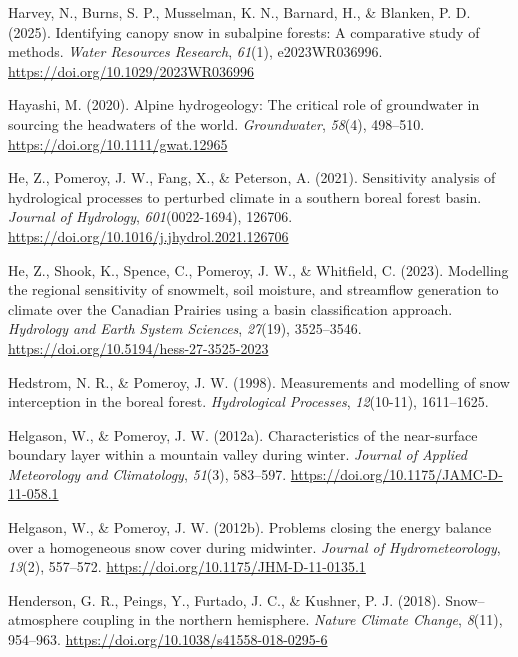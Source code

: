 \documentclass[
  letterpaper,
]{tex/uofsthesis-cs}
\newlength{\cslhangindent}
\newenvironment{CSLReferences}[2] %
 {\begin{list}{}{%
  \setlength{\itemindent}{0pt}
  \setlength{\leftmargin}{0pt}
  \setlength{\parsep}{0pt}
  \ifodd #1
   \setlength{\leftmargin}{\cslhangindent}
   \setlength{\itemindent}{-1\cslhangindent}
  \fi
  \setlength{\itemsep}{#2\baselineskip}}}
 {\end{list}}
\begin{document}
\begin{CSLReferences}{1}{0}
Harvey, N., Burns, S. P., Musselman, K. N., Barnard, H., \& Blanken, P.
D. (2025). Identifying canopy snow in subalpine forests: A comparative
study of methods. \emph{Water Resources Research}, \emph{61}(1),
e2023WR036996. \url{https://doi.org/10.1029/2023WR036996}

Hayashi, M. (2020). Alpine hydrogeology: {The} critical role of
groundwater in sourcing the headwaters of the world. \emph{Groundwater},
\emph{58}(4), 498--510. \url{https://doi.org/10.1111/gwat.12965}

He, Z., Pomeroy, J. W., Fang, X., \& Peterson, A. (2021). Sensitivity
analysis of hydrological processes to perturbed climate in a southern
boreal forest basin. \emph{Journal of Hydrology}, \emph{601}(0022-1694),
126706. \url{https://doi.org/10.1016/j.jhydrol.2021.126706}

He, Z., Shook, K., Spence, C., Pomeroy, J. W., \& Whitfield, C. (2023).
Modelling the regional sensitivity of snowmelt, soil moisture, and
streamflow generation to climate over the {Canadian Prairies} using a
basin classification approach. \emph{Hydrology and Earth System
Sciences}, \emph{27}(19), 3525--3546.
\url{https://doi.org/10.5194/hess-27-3525-2023}

Hedstrom, N. R., \& Pomeroy, J. W. (1998). Measurements and modelling of
snow interception in the boreal forest. \emph{Hydrological Processes},
\emph{12}(10-11), 1611--1625.

Helgason, W., \& Pomeroy, J. W. (2012a). Characteristics of the
near-surface boundary layer within a mountain valley during winter.
\emph{Journal of Applied Meteorology and Climatology}, \emph{51}(3),
583--597. \url{https://doi.org/10.1175/JAMC-D-11-058.1}

Helgason, W., \& Pomeroy, J. W. (2012b). Problems closing the energy
balance over a homogeneous snow cover during midwinter. \emph{Journal of
Hydrometeorology}, \emph{13}(2), 557--572.
\url{https://doi.org/10.1175/JHM-D-11-0135.1}

Henderson, G. R., Peings, Y., Furtado, J. C., \& Kushner, P. J. (2018).
Snow--atmosphere coupling in the northern hemisphere. \emph{Nature
Climate Change}, \emph{8}(11), 954--963.
\url{https://doi.org/10.1038/s41558-018-0295-6}


\end{CSLReferences}
\end{document}
